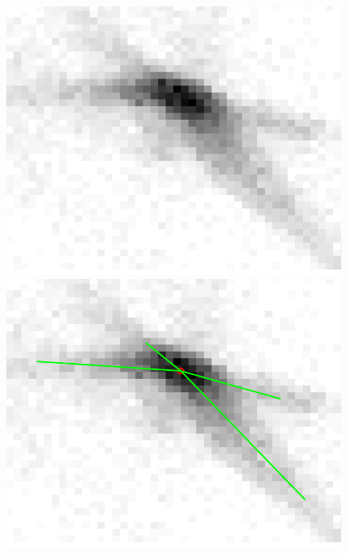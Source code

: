 	\begin{figure}[htp]
	\centering
	\begin{minipage}[c]{0.4\textwidth}
	\includegraphics[width=\textwidth]{figures/tail07.pdf}
	\end{minipage}
	\begin{minipage}[c]{0.4\textwidth}
	\includegraphics[width=\textwidth]{figures/tail08.pdf}
	\end{minipage}\\
	\begin{minipage}[c]{0.4\textwidth}

\end{minipage}
\end{figure}
